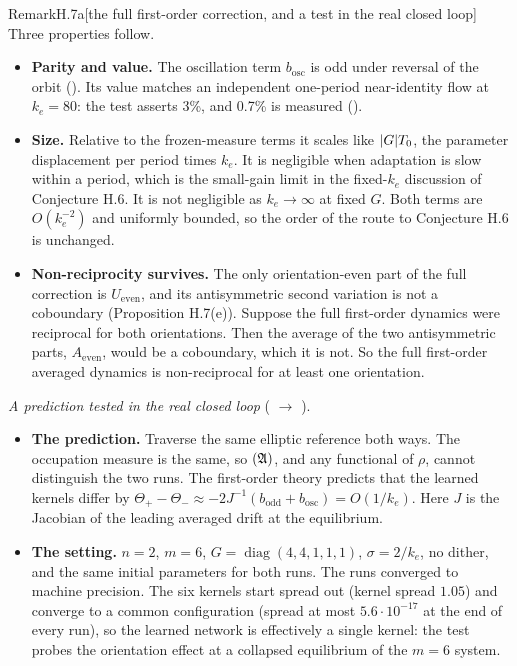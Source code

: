 \begin{rmk}{Remark}{H.7a}[the full first-order correction, and a test in the real closed loop]
Three properties follow.
\begin{itemize}
  \item \textbf{Parity and value.} The oscillation term $b_{\mathrm{osc}}$ is odd under reversal of the orbit
    (). Its value matches an independent one-period
    near-identity flow at $k_e=80$: the test asserts 3\%, and 0.7\% is measured
    ().
  \item \textbf{Size.} Relative to the frozen-measure terms it scales like $\lvert G\rvert T_0$, the parameter displacement
    per period times $k_e$. It is negligible when adaptation is slow within a period, which is the small-gain limit in
    the fixed-$k_e$ discussion of Conjecture H.6. It is not negligible as $k_e\to\infty$ at fixed $G$. Both terms are
    $O(k_e^{-2})$ and uniformly bounded, so the order of the route to Conjecture H.6 is unchanged.
  \item \textbf{Non-reciprocity survives.} The only orientation-even part of the full correction is
    $U_{\mathrm{even}}$, and its antisymmetric second variation is not a coboundary (Proposition H.7(e)). Suppose the
    full first-order dynamics were reciprocal for both orientations. Then the average of the two antisymmetric parts,
    $A_{\mathrm{even}}$, would be a coboundary, which it is not. So the full first-order averaged dynamics is
    non-reciprocal for at least one orientation.
\end{itemize}

\emph{A prediction tested in the real closed loop} ( $\to$
).
\begin{itemize}
  \item \textbf{The prediction.} Traverse the same elliptic reference both ways. The occupation measure is the same,
    so $(\mathfrak{A})$, and any functional of $\rho$, cannot distinguish the two runs. The first-order theory predicts that the
    learned kernels differ by
    $\Theta_+ - \Theta_- \approx -2J^{-1}(b_{\mathrm{odd}} + b_{\mathrm{osc}}) = O(1/k_e)$. Here $J$ is the Jacobian
    of the leading averaged drift at the equilibrium.
  \item \textbf{The setting.} $n=2$, $m=6$, $G=\operatorname{diag}(4,4,1,1,1)$, $\sigma=2/k_e$, no dither, and the
    same initial parameters for both runs. The runs converged to machine precision. The six kernels start spread
    out (kernel spread $1.05$) and converge to a common configuration (spread at most $5.6\cdot10^{-17}$ at the
    end of every run), so the learned network is effectively a single kernel: the test probes the orientation
    effect at a collapsed equilibrium of the $m=6$ system.
\end{itemize}


\end{rmk}
